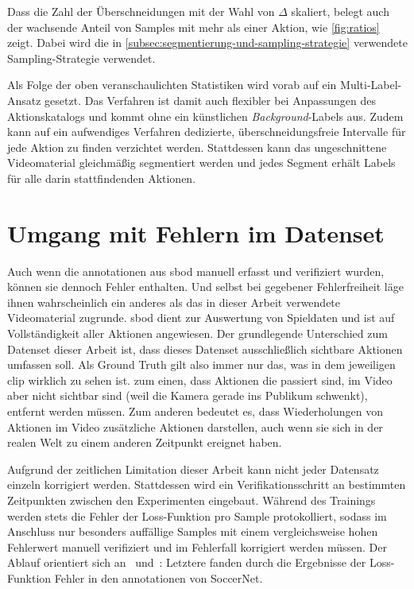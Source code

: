 Dass die Zahl der Überschneidungen mit der Wahl von $\Delta$ skaliert, belegt auch der wachsende Anteil von Samples mit mehr als einer Aktion, wie \autoref{fig:ratios} zeigt.
Dabei wird die in \autoref{subsec:segmentierung-und-sampling-strategie} verwendete Sampling-Strategie verwendet.

Als Folge der oben veranschaulichten Statistiken wird vorab auf ein Multi-Label-Ansatz gesetzt.
Das Verfahren ist damit auch flexibler bei Anpassungen des Aktionskatalogs und kommt ohne ein künstlichen \emph{Background}-Labels aus.
Zudem kann auf ein aufwendiges Verfahren dedizierte, überschneidungsfreie Intervalle für jede Aktion zu finden verzichtet werden.
Stattdessen kann das ungeschnittene Videomaterial gleichmäßig segmentiert werden und jedes Segment erhält Labels für alle darin stattfindenden Aktionen.

\section{Umgang mit Fehlern im Datenset}
\label{sec:umgang-mit-fehlern-in-datenset}

Auch wenn die \gls{annotationen} aus \gls{sbod} manuell erfasst und verifiziert wurden, können sie dennoch Fehler enthalten.
Und selbst bei gegebener Fehlerfreiheit läge ihnen wahrscheinlich ein anderes als das in dieser Arbeit verwendete Videomaterial zugrunde.
\gls{sbod} dient zur Auswertung von Spieldaten und ist auf Vollständigkeit aller Aktionen angewiesen.
Der grundlegende Unterschied zum Datenset dieser Arbeit ist, dass dieses Datenset ausschließlich sichtbare Aktionen umfassen soll.
Als Ground Truth gilt also immer nur das, was in dem jeweiligen \gls{clip} wirklich zu sehen ist.
\Dh zum einen, dass Aktionen die passiert sind, im Video aber nicht sichtbar sind (\zB weil die Kamera gerade ins Publikum schwenkt), entfernt werden müssen.
Zum anderen bedeutet es, dass Wiederholungen von Aktionen im Video zusätzliche Aktionen darstellen, auch wenn sie sich in der realen Welt zu einem anderen Zeitpunkt ereignet haben.

Aufgrund der zeitlichen Limitation dieser Arbeit kann nicht jeder Datensatz einzeln korrigiert werden.
Stattdessen wird ein Verifikationsschritt an bestimmten Zeitpunkten zwischen den Experimenten eingebaut.
Während des Trainings werden stets die Fehler der Loss-Funktion pro Sample protokolliert, sodass im Anschluss nur besonders auffällige Samples mit einem vergleichsweise hohen Fehlerwert manuell verifiziert und im Fehlerfall korrigiert werden müssen.
Der Ablauf orientiert sich an~\cite{Gugger20} und~\cite{Cioppa20}:
Letztere fanden durch die Ergebnisse der Loss-Funktion Fehler in den \gls{annotationen} von SoccerNet.

